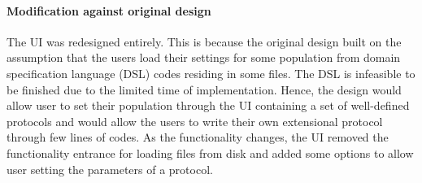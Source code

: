 \paragraph{Modification against original design}
The UI was redesigned entirely. This is because the original design built on the assumption
that the users load their settings for some population from domain specification language (DSL) codes residing in
some files. The DSL is infeasible to be finished due to the limited time of implementation.
Hence, the design would allow user to set their population through the UI containing a set of well-defined
protocols and would allow the users to write their own extensional protocol through few lines of codes.
As the functionality changes, the UI removed the functionality entrance for loading files from disk and
added some options to allow user setting the parameters of a protocol.

